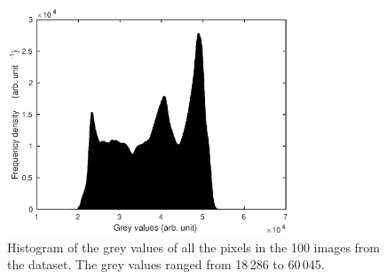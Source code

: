 \documentclass[12pt]{report}
\begin{document}
\begin{figure}[htp]
\centering
\includegraphics[width=0.75\textwidth]{figures/block_histogram.eps}
\caption{Histogram of the grey values of all the pixels in the 100 images from the dataset. The grey values ranged from 18\,286 to 60\,045.}
\label{fig:block_histogram}
\end{figure}
\end{document}
